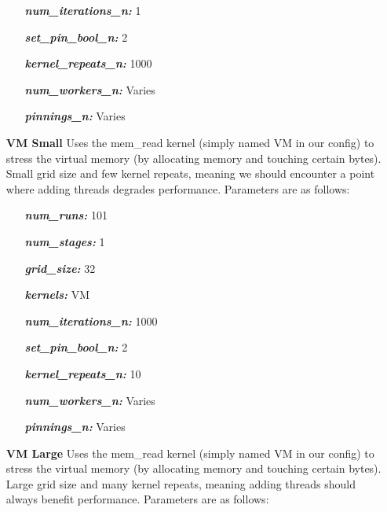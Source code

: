 \begin{itemize}
\begin{itemize}
        \item[\textit{\textbf{num\_iterations\_n:}}] 1
        
        \item[\textit{\textbf{set\_pin\_bool\_n:}}] 2
        
        \item[\textit{\textbf{kernel\_repeats\_n:}}] 1000
        
        \item[\textit{\textbf{num\_workers\_n:}}] Varies
        
        \item[\textit{\textbf{pinnings\_n:}}] Varies
    \end{itemize}
    
    \item[\textbf{VM Small}] Uses the mem\_read kernel (simply named VM in our config) to stress the virtual memory (by allocating memory and touching certain bytes). Small grid size and few kernel repeats, meaning we should encounter a point where adding threads degrades performance. Parameters are as follows:
    
    \begin{itemize}
        \item[\textit{\textbf{num\_runs:}}] 101
        
        \item[\textit{\textbf{num\_stages:}}] 1
        
        \item[\textit{\textbf{grid\_size:}}] 32
        
        \item[\textit{\textbf{kernels:}}] VM
        
        \item[\textit{\textbf{num\_iterations\_n:}}] 1000
        
        \item[\textit{\textbf{set\_pin\_bool\_n:}}] 2
        
        \item[\textit{\textbf{kernel\_repeats\_n:}}] 10
        
        \item[\textit{\textbf{num\_workers\_n:}}] Varies
        
        \item[\textit{\textbf{pinnings\_n:}}] Varies
    \end{itemize}
    
    \item[\textbf{VM Large}] Uses the mem\_read kernel (simply named VM in our config) to stress the virtual memory (by allocating memory and touching certain bytes). Large grid size and many kernel repeats, meaning adding threads should always benefit performance. Parameters are as follows:
    

\end{itemize}
